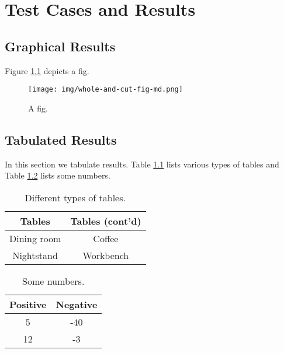 \chapter{Test Cases and Results}

\section{Graphical Results}

Figure \ref{figs} depicts a fig.

\begin{figure}[!htb]
\centering
\texttt{[image: img/whole-and-cut-fig-md.png]}
\caption{A fig.}
\label{figs}
\end{figure}

\section{Tabulated Results}

In this section we tabulate results. Table \ref{tables} lists various types of
tables and Table \ref{numbers} lists some numbers.

\begin{table}[!htb]
\centering
\caption{Different types of tables.}
\begin{tabular}{cc}
\multicolumn{1}{c}{\textbf{Tables}} & 
\multicolumn{1}{c}{\textbf{Tables (cont'd)}} \\
\hline
Dining room & Coffee \\
Nightstand & Workbench 
\end{tabular}
\label{tables}
\end{table}

\begin{table}[!htb]
\centering
\caption{Some numbers.}
\begin{tabular}{|c|c|}
\hline
\multicolumn{1}{|l|}{\textbf{Positive}} & 
\multicolumn{1}{l|}{\textbf{Negative}} \\
\hline
5 & -40 \\
\hline
12 & -3 \\
\hline
\end{tabular}
\label{numbers}
\end{table}
